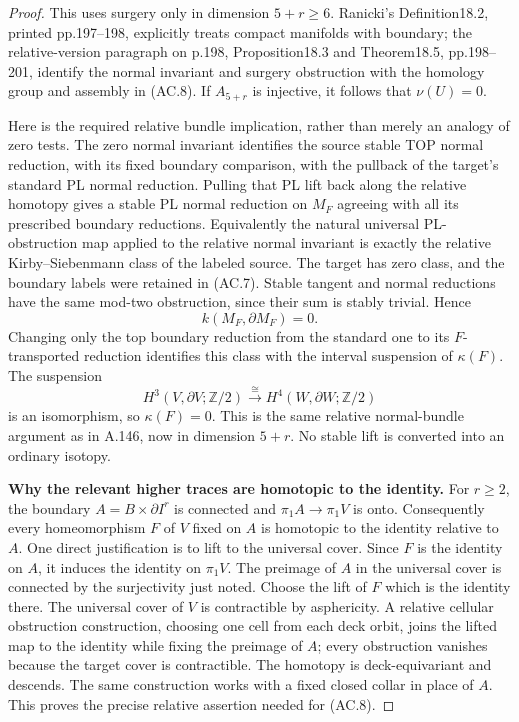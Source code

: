 \begin{proof}
This uses surgery only in dimension $5+r\ge6$. Ranicki's
Definition18.2, printed pp.197--198, explicitly treats compact
manifolds with boundary; the relative-version paragraph on p.198,
Proposition18.3 and Theorem18.5, pp.198--201, identify the normal
invariant and surgery obstruction with the homology group and
assembly in (AC.8). If $A_{5+r}$ is injective, it follows that
$\nu(U)=0$.

Here is the required relative bundle implication, rather than merely
an analogy of zero tests. The zero normal invariant identifies the
source stable TOP normal reduction, with its fixed boundary
comparison, with the pullback of the target's standard PL normal
reduction. Pulling that PL lift back along the relative homotopy gives
a stable PL normal reduction on $M_F$ agreeing with all its prescribed
boundary reductions. Equivalently the natural universal PL-obstruction
map applied to the relative normal invariant is exactly the relative
Kirby--Siebenmann class of the labeled source. The target has zero
class, and the boundary labels were retained in (AC.7). Stable tangent
and normal reductions have the same mod-two obstruction, since their
sum is stably trivial. Hence
\[
 k(M_F,\partial M_F)=0.
\]
Changing only the top boundary reduction from the standard one to its
$F$-transported reduction identifies this class with the interval
suspension of $\kappa(F)$. The suspension
\[
 H^3(V,\partial V;\mathbb Z/2)
       \xrightarrow{\cong}H^4(W,\partial W;\mathbb Z/2)
\]
is an isomorphism, so $\kappa(F)=0$. This is the same relative
normal-bundle argument as in A.146, now in dimension $5+r$.
No stable lift is converted into an ordinary isotopy.

\textbf{Why the relevant higher traces are homotopic to the identity.}
For $r\ge2$, the boundary $A=B\times\partial I^r$ is connected and
$\pi_1A\to\pi_1V$ is onto. Consequently every homeomorphism $F$ of
$V$ fixed on $A$ is homotopic to the identity relative to $A$.
One direct justification is to lift to the universal cover. Since
$F$ is the identity on $A$, it induces the identity on $\pi_1V$.
The preimage of $A$ in the universal cover is connected by the
surjectivity just noted. Choose the lift of $F$ which is the identity
there. The universal cover of $V$ is contractible by asphericity.
A relative cellular obstruction construction, choosing one cell from
each deck orbit, joins the lifted map to the identity while fixing
the preimage of $A$; every obstruction vanishes because the target
cover is contractible. The homotopy is deck-equivariant and descends.
The same construction works with a fixed closed collar in place of
$A$. This proves the precise relative assertion needed for (AC.8).


\end{proof}
